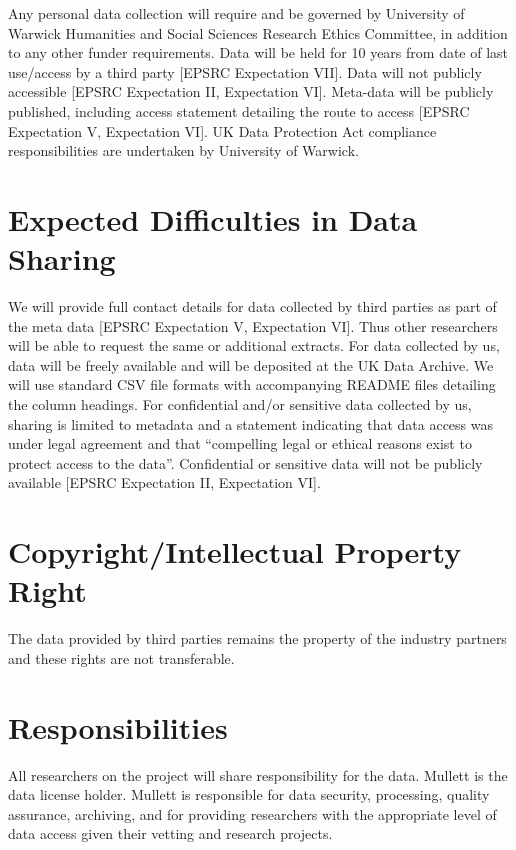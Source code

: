 \documentclass[doc]{apa6}
\begin{document}
Any personal data collection will require and be governed by University of Warwick Humanities and Social Sciences Research Ethics Committee, in addition to any other funder requirements. Data will be held for 10 years from date of last use/access by a third party [EPSRC Expectation VII]. Data will not publicly accessible [EPSRC Expectation II, Expectation VI]. Meta-data will be publicly published, including access statement detailing the route to access [EPSRC Expectation V, Expectation VI]. UK Data Protection Act compliance responsibilities are undertaken by University of Warwick.

\section{Expected Difficulties in Data Sharing}

We will provide full contact details for data collected by third parties as part of the meta data [EPSRC Expectation V, Expectation VI]. Thus other researchers will be able to request the same or additional extracts. For data collected by us, data will be freely available and will be deposited at the UK Data Archive. We will use standard CSV file formats with accompanying README files detailing the column headings. For confidential and/or sensitive data collected by us, sharing is limited to metadata and a statement indicating that data access was under legal agreement and that ``compelling legal or ethical reasons exist to protect access to the data''. Confidential or sensitive data will not be publicly available [EPSRC Expectation II, Expectation VI].

\section{Copyright/Intellectual Property Right}

The data provided by third parties remains the property of the industry partners and these rights are not transferable. 

\section{Responsibilities}

All researchers on the project will share responsibility for the data. Mullett is the data license holder. Mullett is responsible for data security, processing, quality assurance, archiving, and for providing researchers with the appropriate level of data access given their vetting and research projects. 
\end{document}
